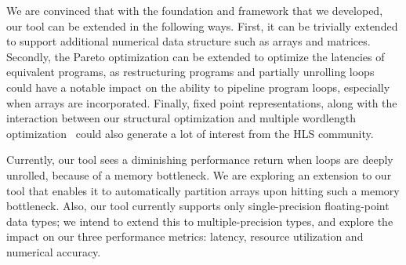We are convinced that with the foundation and framework that we developed,
our tool can be extended in the following ways.  First, it can be trivially
extended to support additional numerical data structure such as arrays and
matrices.  Secondly, the Pareto optimization can be extended to optimize the
latencies of equivalent programs, as restructuring programs and partially
unrolling loops could have a notable impact on the ability to pipeline
program loops, especially when arrays are incorporated.  Finally, fixed point
representations, along with the interaction between our structural optimization
and multiple wordlength optimization~\cite{constantinides} could also generate
a lot of interest from the HLS community.

Currently, our tool sees a diminishing performance return when loops are deeply
unrolled, because of a memory bottleneck. We are exploring an extension to
our tool that enables it to automatically partition arrays upon hitting such
a memory bottleneck. Also, our tool currently supports only single-precision
floating-point data types; we intend to extend this to multiple-precision
types, and explore the impact on our three performance metrics: latency,
resource utilization and numerical accuracy.


\cleardoublepage


{%
\renewcommand{\bibfont}{\normalfont\small}
\setlength{\biblabelsep}{0pt}
\setlength{\bibitemsep}{0.5\baselineskip plus 0.5\baselineskip}
\printbibliography[nottype=online]
\printbibliography[heading=subbibliography,title={Webseiten},type=online,prefixnumbers={@}]
}
\cleardoublepage

\listoffigures
\cleardoublepage

\listoftables
\cleardoublepage

% 

% 


